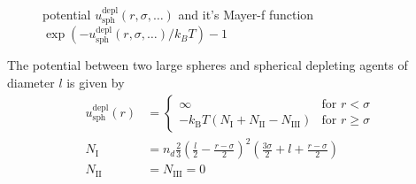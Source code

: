 \begin{figure}[htb]
\captionsetup[subfigure]{position=b}
\centering
{}
\hfill
{}
\caption{potential $u^\text{depl}_\text{sph}(r,\sigma,\ldots)$ and it's Mayer-f function $\exp(-u^\text{depl}_\text{sph}(r,\sigma,\ldots)/k_BT)-1$}
\end{figure}

The potential between two large spheres and spherical depleting agents of diameter $l$
is given by
\begin{align}
u^\text{depl}_\text{sph}(r) &=
\begin{cases}
\infty & \mbox{for } r<\sigma \\
-k_\text{B} T (N_\text{I}+N_\text{II}-N_\text{III}) & \mbox{for } r\geq\sigma
\end{cases}\\
N_\text{I} &= n_d \frac{2}{3}\left(\frac{l}{2}-\frac{r-\sigma}{2}\right)^2
                \left(\frac{3\sigma}{2}+l+\frac{r-\sigma}{2}\right)\\
N_\text{II} &= N_\text{III} = 0
\end{align}


